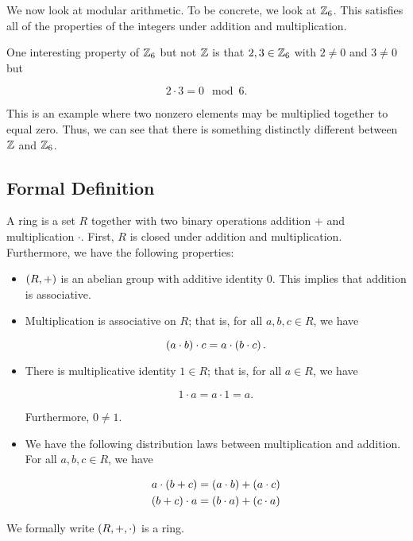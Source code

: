 \begin{example}
We now look at modular arithmetic.
To be concrete, we look at $\mathbb{Z}_{6}$.
This satisfies all of the properties of the integers under addition
and multiplication.

One interesting property of $\mathbb{Z}_{6}$ but not $\mathbb{Z}$ is that $2,3\in\mathbb{Z}_{6}$
with $2\ne0$ and $3\ne0$ but

\begin{equation}
    2\cdot 3 = 0 \mod 6.
\end{equation}

\noindent
This is an example where two nonzero elements may be multiplied
together to equal zero.
Thus, we can see that there is something distinctly different
between $\mathbb{Z}$ and $\mathbb{Z}_{6}$.
\end{example}

\subsection{Formal Definition}

\begin{defn}[Ring]
A \gls{ring} is a \gls{set} $R$ together with two binary operations addition $+$
and multiplication $\cdot$.
First, $R$ is closed under addition and multiplication.
Furthermore, we have the following properties:

\begin{itemize}
\item $\left( R,+ \right)$ is an \gls{abelian group} with additive identity $0$.
    This implies that addition is \gls{associative}.
\item Multiplication is \gls{associative} on $R$; that is,
    for all $a,b,c \in R$, we have

\begin{equation}
    \left( a\cdot b \right)\cdot c = a\cdot\left( b\cdot c \right).
\end{equation}
\item There is multiplicative identity $1\in R$; that is, 
    for all $a\in R$, we have

\begin{equation}
    1\cdot a = a\cdot 1 = a.
\end{equation}

\noindent
Furthermore, $0\ne 1$.

\item We have the following distribution laws between multiplication
    and addition.
    For all $a,b,c\in R$, we have

\begin{align}
    a\cdot\left( b + c \right) &= \left( a\cdot b \right) + \left( a\cdot c \right)
        \nonumber\\
    \left( b + c \right)\cdot a &= \left( b\cdot a \right) + \left( c\cdot a \right)
\end{align}
\end{itemize}

\noindent
We formally write $\left( R,+,\cdot \right)$ is a ring.
\end{defn}

